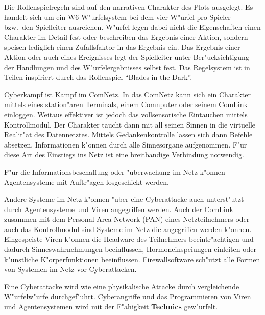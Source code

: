 
Die Rollenspielregeln sind auf den narrativen Charakter des Plots ausgelegt. Es handelt sich um ein W6 W"urfelsystem bei dem vier W"urfel pro Spieler bzw.~den Spielleiter ausreichen. W"urfel legen dabei nicht die Eigenschaften einen Charakter im Detail fest oder beschreiben das Ergebnis einer Aktion, sondern speisen lediglich einen Zufallsfaktor in das Ergebnis ein. Das Ergebnis einer Aktion oder auch eines Ereignisses legt der Spielleiter unter Ber"ucksichtigung der Handlungen und des W"urfelergebnisses selbst fest. Das Regelsystem ist in Teilen inspiriert durch das Rollenspiel ``Blades in the Dark''.










Cyberkampf ist Kampf im ComNetz. In das ComNetz kann sich ein Charakter mittels eines station"aren Terminals, einem Comnputer oder seinem ComLink einloggen. Weitaus effektiver ist jedoch das vollsensorische Eintauchen mittels Kontrollmodul. Der Charakter taucht dann mit all seinen Sinnen in die virtuelle Realit"at des Datennetztes. Mittels Gedankenkontrolle lassen sich dann Befehle absetzen. Informationen k"onnen durch alle Sinnesorgane aufgenommen. F"ur diese Art des Einstiegs ins Netz ist eine breitbandige Verbindung notwendig. 

F"ur die Informationsbeschaffung oder "uberwachung im Netz k"onnen Agentensysteme mit Auftr"agen losgeschickt werden. 

Andere Systeme im Netz k"onnen "uber eine Cyberattacke auch unterst"utzt durch Agentensysteme und Viren angegriffen werden. Auch der ComLink zusammen mit dem Personal Area Network (PAN) eines Netzteilnehmers oder auch das Kontrollmodul sind Systeme im Netz die angegriffen werden k"onnen. Eingespeiste Viren k"onnen die Headware des Teilnehmers beeintr"achtigen und dadurch Sinneswahrnehmungen beeinflussen, Hormoneinspei\3ungen einleiten oder k"unstliche K"orperfunktionen beeinflussen. Firewallsoftware sch"utzt alle Formen von Systemen im Netz vor Cyberattacken.

Eine Cyberattacke wird wie eine physikalische Attacke durch vergleichende W"urfelw"urfe durchgef"uhrt. Cyberangriffe und das Programmieren von Viren und Agentensystemen wird mit der F"ahigkeit \textbf{Technics} gew"urfelt.

